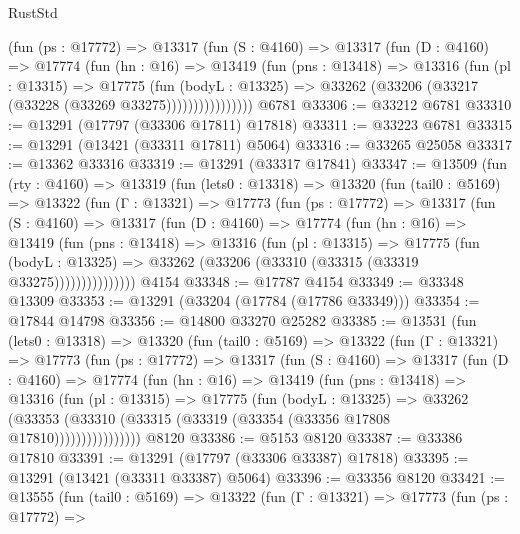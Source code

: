 \begin{lexlean}{RustStd}
\begin{coremodule}
              (fun (ps : @17772) =>
              @13317
                (fun (S : @4160) =>
                @13317
                  (fun (D : @4160) =>
                  @17774
                    (fun (hn : @16) =>
                    @13419
                      (fun (pns : @13418) =>
                      @13316
                        (fun (pl : @13315) =>
                        @17775
                          (fun (bodyL : @13325) =>
                          @33262 (@33206 (@33217 (@33228 (@33269 @33275))))))))))))))))
    @6781
@33306 := @33212 @6781
@33310 := @13291 (@17797 (@33306 @17811) @17818)
@33311 := @33223 @6781
@33315 := @13291 (@13421 (@33311 @17811) @5064)
@33316 := @33265 @25058
@33317 := @13362 @33316
@33319 := @13291 (@33317 @17841)
@33347 := @13509
    (fun (rty : @4160) =>
    @13319
      (fun (lets0 : @13318) =>
      @13320
        (fun (tail0 : @5169) =>
        @13322
          (fun (Γ : @13321) =>
          @17773
            (fun (ps : @17772) =>
            @13317
              (fun (S : @4160) =>
              @13317
                (fun (D : @4160) =>
                @17774
                  (fun (hn : @16) =>
                  @13419
                    (fun (pns : @13418) =>
                    @13316
                      (fun (pl : @13315) =>
                      @17775
                        (fun (bodyL : @13325) =>
                        @33262 (@33206 (@33310 (@33315 (@33319 @33275)))))))))))))))
    @4154
@33348 := @17787 @4154
@33349 := @33348 @13309
@33353 := @13291 (@33204 (@17784 (@17786 @33349)))
@33354 := @17844 @14798
@33356 := @14800 @33270 @25282
@33385 := @13531
    (fun (lets0 : @13318) =>
    @13320
      (fun (tail0 : @5169) =>
      @13322
        (fun (Γ : @13321) =>
        @17773
          (fun (ps : @17772) =>
          @13317
            (fun (S : @4160) =>
            @13317
              (fun (D : @4160) =>
              @17774
                (fun (hn : @16) =>
                @13419
                  (fun (pns : @13418) =>
                  @13316
                    (fun (pl : @13315) =>
                    @17775
                      (fun (bodyL : @13325) =>
                      @33262
                        (@33353
                          (@33310 (@33315 (@33319 (@33354 (@33356 @17808 @17810))))))))))))))))
    @8120
@33386 := @5153 @8120
@33387 := @33386 @17810
@33391 := @13291 (@17797 (@33306 @33387) @17818)
@33395 := @13291 (@13421 (@33311 @33387) @5064)
@33396 := @33356 @8120
@33421 := @13555
    (fun (tail0 : @5169) =>
    @13322
      (fun (Γ : @13321) =>
      @17773
        (fun (ps : @17772) =>

\end{coremodule}
\end{lexlean}
